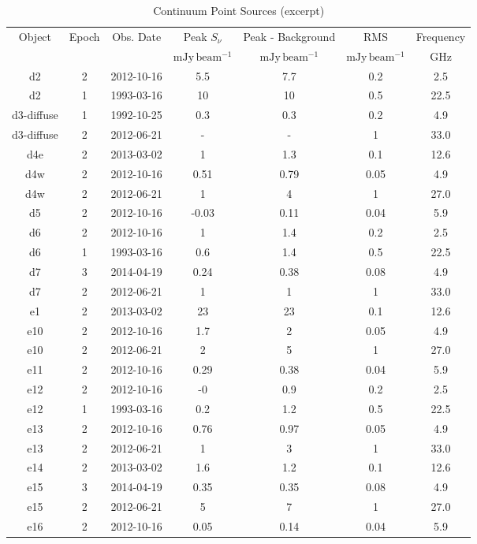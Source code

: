 \begin{table*}[htp]
\caption{Continuum Point Sources (excerpt)}
\begin{tabular}{ccccccc}
\label{tab:contsrcs}
Object & Epoch & Obs. Date & Peak $S_{\nu}$ & Peak - Background & RMS & Frequency \\
$\mathrm{}$ & $\mathrm{}$ & $\mathrm{}$ & $\mathrm{mJy\,beam^{-1}}$ & $\mathrm{mJy\,beam^{-1}}$ & $\mathrm{mJy\,beam^{-1}}$ & $\mathrm{GHz}$ \\
\hline
d2 & 2 & 2012-10-16 & 5.5 & 7.7 & 0.2 & 2.5 \\
d2 & 1 & 1993-03-16 & 10 & 10 & 0.5 & 22.5 \\
d3-diffuse & 1 & 1992-10-25 & 0.3 & 0.3 & 0.2 & 4.9 \\
d3-diffuse & 2 & 2012-06-21 & - & - & 1 & 33.0 \\
d4e & 2 & 2013-03-02 & 1 & 1.3 & 0.1 & 12.6 \\
d4w & 2 & 2012-10-16 & 0.51 & 0.79 & 0.05 & 4.9 \\
d4w & 2 & 2012-06-21 & 1 & 4 & 1 & 27.0 \\
d5 & 2 & 2012-10-16 & -0.03 & 0.11 & 0.04 & 5.9 \\
d6 & 2 & 2012-10-16 & 1 & 1.4 & 0.2 & 2.5 \\
d6 & 1 & 1993-03-16 & 0.6 & 1.4 & 0.5 & 22.5 \\
d7 & 3 & 2014-04-19 & 0.24 & 0.38 & 0.08 & 4.9 \\
d7 & 2 & 2012-06-21 & 1 & 1 & 1 & 33.0 \\
e1 & 2 & 2013-03-02 & 23 & 23 & 0.1 & 12.6 \\
e10 & 2 & 2012-10-16 & 1.7 & 2 & 0.05 & 4.9 \\
e10 & 2 & 2012-06-21 & 2 & 5 & 1 & 27.0 \\
e11 & 2 & 2012-10-16 & 0.29 & 0.38 & 0.04 & 5.9 \\
e12 & 2 & 2012-10-16 & -0 & 0.9 & 0.2 & 2.5 \\
e12 & 1 & 1993-03-16 & 0.2 & 1.2 & 0.5 & 22.5 \\
e13 & 2 & 2012-10-16 & 0.76 & 0.97 & 0.05 & 4.9 \\
e13 & 2 & 2012-06-21 & 1 & 3 & 1 & 33.0 \\
e14 & 2 & 2013-03-02 & 1.6 & 1.2 & 0.1 & 12.6 \\
e15 & 3 & 2014-04-19 & 0.35 & 0.35 & 0.08 & 4.9 \\
e15 & 2 & 2012-06-21 & 5 & 7 & 1 & 27.0 \\
e16 & 2 & 2012-10-16 & 0.05 & 0.14 & 0.04 & 5.9 \\

\end{tabular}
\end{table*}
